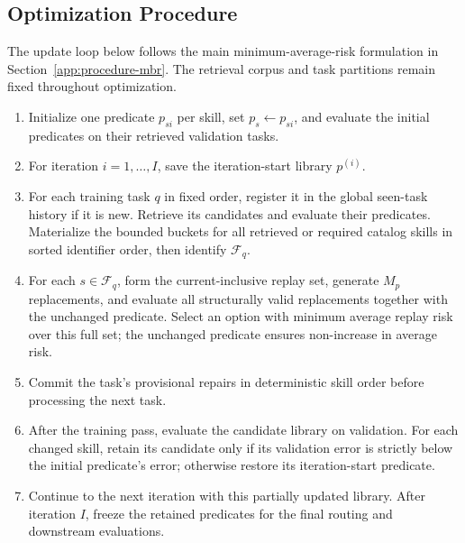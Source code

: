 \subsection{Optimization Procedure}
\label{app:procedure-algorithm}
The update loop below follows the main minimum-average-risk formulation in Section~\ref{app:procedure-mbr}. The retrieval corpus and task partitions remain fixed throughout optimization.
\begin{enumerate}
\item Initialize one predicate $p_{si}$ per skill, set $p_s\leftarrow p_{si}$, and evaluate the initial predicates on their retrieved validation tasks.
\item For iteration $i=1,\ldots,I$, save the iteration-start library $p^{(i)}$.
\item For each training task $q$ in fixed order, register it in the global seen-task history if it is new. Retrieve its candidates and evaluate their predicates. Materialize the bounded buckets for all retrieved or required catalog skills in sorted identifier order, then identify $\mathcal F_q$.
\item For each $s\in\mathcal F_q$, form the current-inclusive replay set, generate $M_p$ replacements, and evaluate all structurally valid replacements together with the unchanged predicate. Select an option with minimum average replay risk over this full set; the unchanged predicate ensures non-increase in average risk.
\item Commit the task's provisional repairs in deterministic skill order before processing the next task.
\item After the training pass, evaluate the candidate library on validation. For each changed skill, retain its candidate only if its validation error is strictly below the initial predicate's error; otherwise restore its iteration-start predicate.
\item Continue to the next iteration with this partially updated library. After iteration $I$, freeze the retained predicates for the final routing and downstream evaluations.
\end{enumerate}
